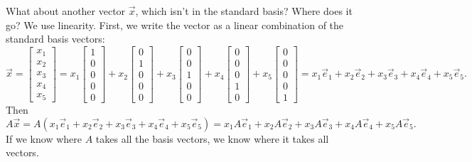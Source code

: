 What about another vector $\vec{x}$, which isn't in the standard basis?
Where does it go?  We use
linearity.  First, we write the vector as a linear combination of the standard
basis vectors:
\begin{equation*}
\vec{x} =
\begin{bmatrix}
x_1 \\ x_2 \\ x_3 \\ x_4 \\ x_5
\end{bmatrix}
=
x_1
\begin{bmatrix}
1 \\ 0 \\ 0 \\ 0 \\ 0
\end{bmatrix}
+
x_2
\begin{bmatrix}
0 \\ 1 \\ 0 \\ 0 \\ 0
\end{bmatrix}
+
x_3
\begin{bmatrix}
0 \\ 0 \\ 1 \\ 0 \\ 0
\end{bmatrix}
+
x_4
\begin{bmatrix}
0 \\ 0 \\ 0 \\ 1 \\ 0
\end{bmatrix}
+
x_5
\begin{bmatrix}
0 \\ 0 \\ 0 \\ 0 \\ 1
\end{bmatrix}
=
x_1 \vec{e}_1 + 
x_2 \vec{e}_2 + 
x_3 \vec{e}_3 + 
x_4 \vec{e}_4 + 
x_5 \vec{e}_5 .
\end{equation*}
Then
\begin{equation*}
A \vec{x}
=
A ( 
x_1 \vec{e}_1 + 
x_2 \vec{e}_2 + 
x_3 \vec{e}_3 + 
x_4 \vec{e}_4 + 
x_5 \vec{e}_5 
)
=
x_1 A\vec{e}_1 + 
x_2 A\vec{e}_2 + 
x_3 A\vec{e}_3 + 
x_4 A\vec{e}_4 + 
x_5 A\vec{e}_5 .
\end{equation*}
If we know where $A$ takes all the basis vectors, we know where it takes
all vectors.

